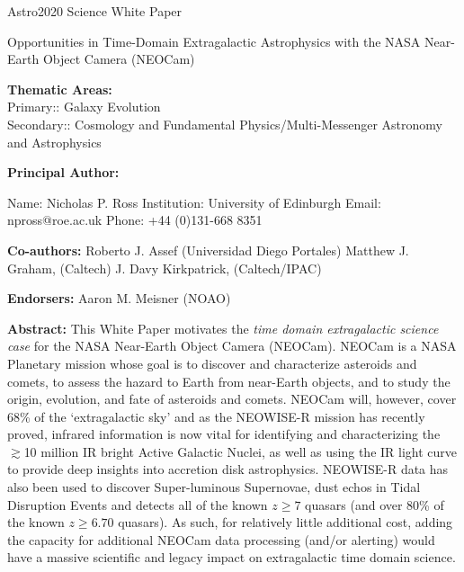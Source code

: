 \documentclass[12pt]{article}
\begin{document}
\raggedright
\huge
Astro2020 Science White Paper \linebreak

\textcolor{Cerulean}{Opportunities in Time-Domain Extragalactic Astrophysics with the NASA
Near-Earth Object Camera (NEOCam)}
\normalsize
\linebreak \linebreak 

\noindent \textbf{Thematic Areas:} \\
Primary:: Galaxy Evolution  \\
Secondary:: Cosmology and Fundamental Physics/Multi-Messenger Astronomy and Astrophysics 
\linebreak
  
\textbf{Principal Author:}

Name: Nicholas P. Ross	
 \linebreak						
Institution:  University of Edinburgh
 \linebreak
Email: npross@roe.ac.uk
 \linebreak
Phone:  +44 (0)131-668 8351
 \linebreak
 
\textbf{Co-authors:} %
  \linebreak
Roberto J. Assef (Universidad Diego Portales)   \linebreak
Matthew J. Graham, (Caltech) \linebreak 
J. Davy Kirkpatrick, (Caltech/IPAC) \linebreak


\textbf{Endorsers:} %
 \linebreak
Aaron M. Meisner (NOAO) 
\linebreak

\justify
\textbf{Abstract:}
This White Paper motivates the {\it time domain extragalactic science
case} for the NASA Near-Earth Object Camera (NEOCam). NEOCam is a NASA
Planetary mission whose goal is to discover and characterize asteroids
and comets, to assess the hazard to Earth from near-Earth objects, and
to study the origin, evolution, and fate of asteroids and
comets. NEOCam will, however, cover 68\% of the `extragalactic sky'
and as the NEOWISE-R mission has recently proved, infrared information
is now vital for identifying and characterizing the $\gtrsim$10
million IR bright Active Galactic Nuclei, as well as using the IR
light curve to provide deep insights into accretion disk
astrophysics. NEOWISE-R data has also been used to discover
Super-luminous Supernovae, dust echos in Tidal Disruption Events and
detects all of the known $z\geq7$ quasars (and over 80\% of the known
$z\geq6.70$ quasars). As such, for relatively little additional cost,
adding the capacity for additional NEOCam data processing (and/or
alerting) would have a massive scientific and legacy impact on
extragalactic time domain science.
\end{document}
